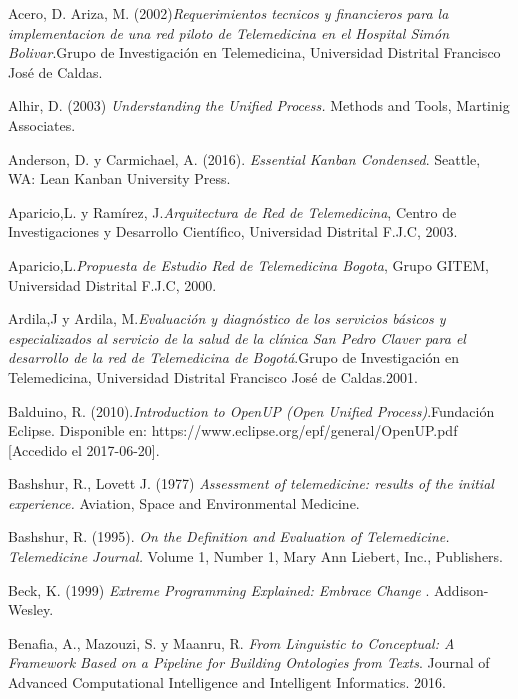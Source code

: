 \begin{thebibliography}{}

 Acero, D. Ariza, M. (2002)\textit{Requerimientos tecnicos y financieros para la implementacion de una red piloto de Telemedicina en el Hospital Simón Bolivar}.Grupo de Investigación en Telemedicina,  Universidad Distrital Francisco José de Caldas.

 Alhir, D. (2003) \textit{Understanding the Unified Process.} Methods and Tools, Martinig Associates.

 Anderson, D. y Carmichael, A. (2016). \textit{Essential Kanban Condensed}. Seattle, WA: Lean Kanban University Press.

 Aparicio,L. y Ramírez, J.\textit{Arquitectura de Red de Telemedicina}, Centro de Investigaciones y Desarrollo Científico, Universidad Distrital F.J.C, 2003.

 Aparicio,L.\textit{Propuesta de Estudio Red de Telemedicina Bogota}, Grupo GITEM, Universidad Distrital F.J.C, 2000.

 Ardila,J y Ardila, M.\textit{Evaluación y diagnóstico de los servicios básicos y especializados al servicio de la salud de la clínica San Pedro Claver para el desarrollo de la red de Telemedicina de Bogotá}.Grupo de Investigación en Telemedicina,  Universidad Distrital Francisco José de Caldas.2001.

 Balduino, R. (2010).\textit{Introduction to OpenUP (Open Unified Process)}.Fundación Eclipse. Disponible en: https://www.eclipse.org/epf/general/OpenUP.pdf [Accedido el 2017-06-20].

 Bashshur, R., Lovett J. (1977) \textit{Assessment of telemedicine: results of the initial experience.} Aviation, Space and Environmental Medicine.

 Bashshur, R. (1995). \textit{On the Definition and Evaluation of Telemedicine. Telemedicine Journal.} Volume 1, Number 1, Mary Ann Liebert, Inc., Publishers.

 Beck, K. (1999) \textit{ Extreme Programming Explained: Embrace Change }. Addison-Wesley. 

 Benafia, A., Mazouzi, S. y Maanru, R. \textit{From Linguistic to Conceptual: A Framework Based on a Pipeline for Building Ontologies from Texts}. Journal of Advanced Computational Intelligence and Intelligent Informatics. 2016.


\end{thebibliography}
